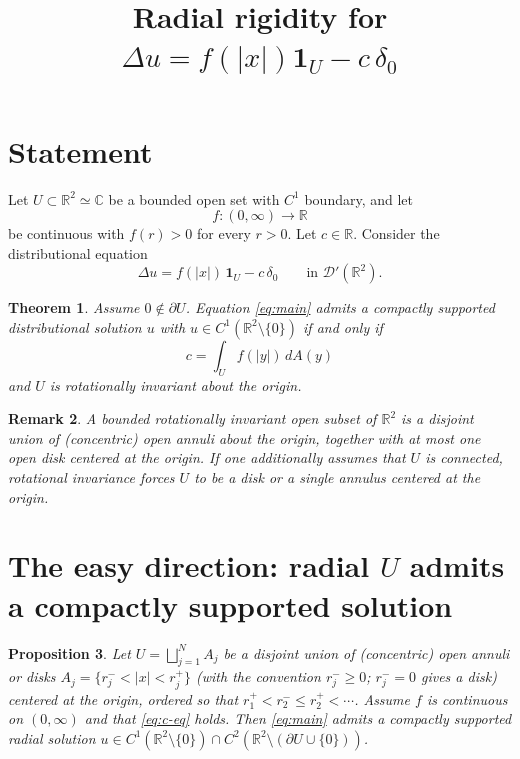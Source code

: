 \documentclass[11pt]{article}
\title{Radial rigidity for $\Delta u=f(|x|)\mathbf 1_U-c\,\delta_0$}
\author{}
\date{}
\newtheorem{theorem}{Theorem}[section]
\newtheorem{proposition}[theorem]{Proposition}
\newtheorem{remark}[theorem]{Remark}
\newcommand{\C}{\mathbb C}
\newcommand{\R}{\mathbb R}
\newcommand{\1}{\mathbf 1}
\begin{document}
\maketitle

\section{Statement}

Let $U\subset\R^2\simeq\C$ be a bounded open set with $C^1$ boundary, and let
\[
f:(0,\infty)\to\R
\]
be continuous with $f(r)>0$ for every $r>0$. Let $c\in\R$. Consider the distributional
equation
\begin{equation}\label{eq:main}
\Delta u=f(|x|)\,\1_U-c\,\delta_0\qquad\text{in }\mathcal D'(\R^2).
\end{equation}

\begin{theorem}\label{thm:main}
Assume $0\notin\partial U$. Equation \eqref{eq:main} admits a compactly supported
distributional solution $u$ with $u\in C^1(\R^2\setminus\{0\})$ if and only if
\begin{equation}\label{eq:c-eq}
c=\int_U f(|y|)\,dA(y)
\end{equation}
and $U$ is rotationally invariant about the origin.
\end{theorem}

\begin{remark}
A bounded rotationally invariant open subset of $\R^2$ is a disjoint union of (concentric)
open annuli about the origin, together with at most one open disk centered at the origin.
If one additionally assumes that $U$ is connected, rotational invariance forces $U$ to be a
disk or a single annulus centered at the origin.
\end{remark}

\section{The easy direction: radial $U$ admits a compactly supported solution}

\begin{proposition}\label{prop:converse}
Let $U=\bigsqcup_{j=1}^N A_j$ be a disjoint union of (concentric) open annuli or disks
$A_j=\{r_j^-<|x|<r_j^+\}$ (with the convention $r_j^-\ge 0$; $r_j^-=0$ gives a disk) centered
at the origin, ordered so that $r_1^+<r_2^-\le r_2^+<\cdots$. Assume $f$ is continuous on
$(0,\infty)$ and that \eqref{eq:c-eq} holds. Then \eqref{eq:main} admits a compactly
supported radial solution $u\in C^1(\R^2\setminus\{0\})\cap C^2(\R^2\setminus(\partial U\cup\{0\}))$.
\end{proposition}
\end{document}
